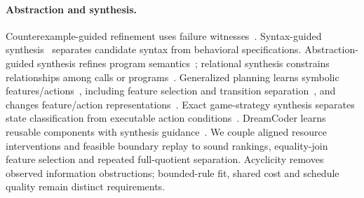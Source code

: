 \paragraph{Abstraction and synthesis.}
Counterexample-guided refinement uses failure witnesses~\cite{clarke2000cegar}.
Syntax-guided synthesis~\cite{alur2013sygus} separates candidate syntax from behavioral
specifications. Abstraction-guided synthesis refines program
semantics~\cite{wang2018abstraction}; relational synthesis constrains
relationships among calls or programs~\cite{wang2018relational}.
Generalized planning learns symbolic features/actions~\cite{bonet2019features},
including feature selection and transition
separation~\cite{frances2021policies}, and changes feature/action
representations~\cite{bonet2018representation}. Exact game-strategy synthesis
separates state classification from executable action
conditions~\cite{fang2024generalized}. DreamCoder learns reusable components
with synthesis guidance~\cite{ellis2021dreamcoder}. We couple aligned resource
interventions and feasible boundary replay to sound rankings, equality-join
feature selection and repeated full-quotient separation. Acyclicity removes
observed information obstructions; bounded-rule fit, shared cost and
schedule quality remain distinct requirements.
